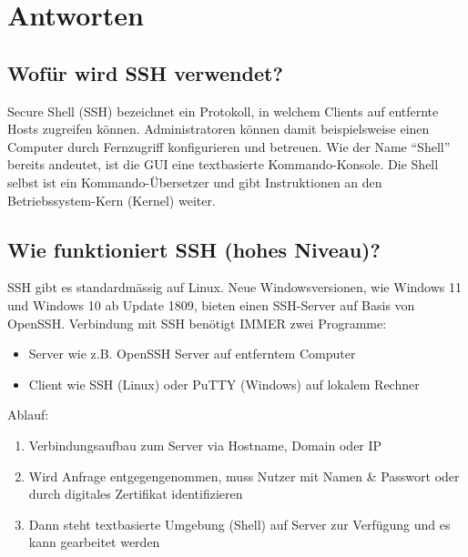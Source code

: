 \section{Antworten}
\subsection*{Wofür wird SSH verwendet?}
Secure Shell (SSH) bezeichnet ein Protokoll, in welchem Clients auf entfernte Hosts zugreifen können. Administratoren können damit beispielsweise einen Computer durch Fernzugriff konfigurieren und betreuen. Wie der Name "`Shell"' bereits andeutet, ist die GUI eine textbasierte Kommando-Konsole. Die Shell selbst ist ein Kommando-Übersetzer und gibt Instruktionen an den Betriebssystem-Kern (Kernel) weiter.

\subsection*{Wie funktioniert SSH (hohes Niveau)?}
SSH gibt es standardmässig auf Linux. Neue Windowsversionen, wie Windows 11 und Windows 10 ab Update 1809, bieten einen SSH-Server auf Basis von OpenSSH.
Verbindung mit SSH benötigt IMMER zwei Programme:
\begin{itemize}
    \item Server wie z.B. OpenSSH Server auf entferntem Computer
    \item Client wie SSH (Linux) oder PuTTY (Windows) auf lokalem Rechner
\end{itemize}
Ablauf:
\begin{enumerate}
    \item Verbindungsaufbau zum Server via Hostname, Domain oder IP
    \item Wird Anfrage entgegengenommen, muss Nutzer mit Namen \& Passwort oder durch digitales Zertifikat identifizieren
    \item Dann steht textbasierte Umgebung (Shell) auf Server zur Verfügung und es kann gearbeitet werden
\end{enumerate}
